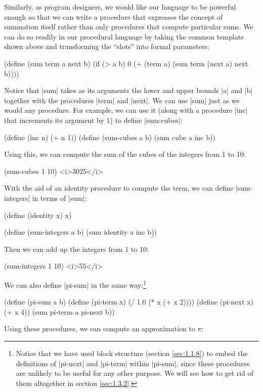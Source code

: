 Similarly, as program designers, we would like our language to
be powerful enough so that we can write a procedure that expresses the
concept of summation itself rather than only procedures
that compute particular sums.  We can do so readily in our
procedural language by taking the common template shown above and
transforming the ``slots'' into formal parameters:

\begin{schemedisplay}
(define (sum term a next b)
  (if (> a b)
      0
      (+ (term a)
         (sum term (next a) next b))))
\end{schemedisplay}
Notice that \scheme|sum| takes as its arguments the lower and upper bounds
\scheme|a| and \scheme|b| together with the procedures \scheme|term| and \scheme|next|.
We can use \scheme|sum| just as we would any procedure.  For example, we can
use it (along with a procedure \scheme|inc| that increments its argument by 1)
to define \scheme|sum-cubes|:

\begin{schemedisplay}
(define (inc n) (+ n 1))
(define (sum-cubes a b)
  (sum cube a inc b))
\end{schemedisplay}
Using this, we can compute the sum of the cubes of the integers from 1
to 10:


\begin{schemedisplay}
(sum-cubes 1 10)
<i>3025</i>
\end{schemedisplay}
With the aid of an identity procedure to compute the term, we can define
\scheme|sum-integers| in terms of \scheme|sum|:


\begin{schemedisplay}
(define (identity x) x)

(define (sum-integers a b)
  (sum identity a inc b))
\end{schemedisplay}
Then we can add up the integers from 1 to 10:


\begin{schemedisplay}
(sum-integers 1 10)
<i>55</i>
\end{schemedisplay}
We can also define \scheme|pi-sum| in the same way:\footnote{Notice
  that we have used block structure (section \ref{sec:1.1.8}) to embed
  the definitions of \scheme|pi-next| and \scheme|pi-term| within
  \scheme|pi-sum|, since these procedures are unlikely to be useful
  for any other purpose.  We will see how to get rid of them
  altogether in section \ref{sec:1.3.2}.}


\begin{schemedisplay}
(define (pi-sum a b)
  (define (pi-term x)
    (/ 1.0 (* x (+ x 2))))
  (define (pi-next x)
    (+ x 4))
  (sum pi-term a pi-next b))
\end{schemedisplay}
Using these procedures, we can compute an approximation to 
$\pi$:


